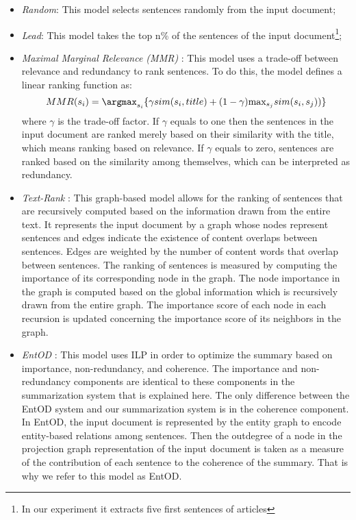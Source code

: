 \begin{itemize}
	\item \emph{Random}: This model selects sentences randomly from the input document;

	\item \emph{Lead}: This model takes the top n\% of the sentences of the input document\footnote{In our experiment it extracts five first sentences of articles};

	\item \emph{Maximal Marginal Relevance (MMR)} \cite{carbonell98}: This model uses a \mbox{trade-off} between relevance and redundancy to rank sentences. 
	 To do this, the model defines a linear ranking function as:
	 \begin{equation}
	 MMR(s_i) = \mathtt{\argmax}_{s_i}\lbrace \gamma sim(s_i,title) + (1-\gamma)\mathtt{\max}_{s_j}sim(s_i,s_j)) \rbrace 
	 \end{equation} 
	 where $\gamma$ is the trade-off factor. 
	 If $\gamma$ equals to one then the sentences in the input document are ranked merely based on their similarity with the title, which means ranking based on relevance. 
	 If $\gamma$ equals to zero, sentences are ranked based on the similarity among themselves, which can be interpreted as redundancy. 

    \item \emph{Text-Rank} \cite{mihalcea04b}: This graph-based model allows for the ranking of sentences that are recursively computed based on the information drawn from the entire text. 
    It represents the input document by a graph whose nodes represent sentences and edges indicate the existence of content overlaps between sentences. 
    Edges are weighted by the number of content words that overlap between sentences. 
    The ranking of sentences is measured by computing the importance of its corresponding node in the graph. 
    The node importance in the graph is computed based on the global information which is recursively drawn from the entire graph. 
    The importance score of each node in each recursion is updated concerning the importance score of its neighbors in the graph. 
    
    \item \emph{EntOD} \cite{parveen15a}: 
    This model uses ILP in order to optimize the summary based on importance, non-redundancy, and coherence. 
    The importance and \mbox{non-redundancy} components are identical to these components in the summarization system that is explained here. 
    The only difference between the EntOD system and our summarization system is in the coherence component. 
    In EntOD, the input document is represented by the entity graph to encode \mbox{entity-based} relations among sentences. 
    Then the outdegree of a node in the projection graph representation of the input document is taken as a measure of the contribution of each sentence to the coherence of the summary. 
    That is why we refer to this model as EntOD. 


\end{itemize}
